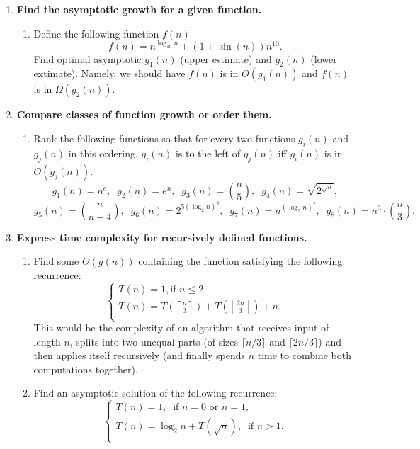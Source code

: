 \documentclass[a4paper,12pt]{article}
\begin{document}
\begin{enumerate}[label=3.\Alph*.]
\item {\bf Find the asymptotic growth for a given function.}
\begin{enumerate} 
\item Define the following function $f(n)$ 
\[ f(n) = n^{\log_{10} n} + (1 + \sin (n)) n^{10}. \]
Find optimal asymptotic $g_1(n)$ (upper estimate) and $g_2(n)$ (lower extimate).
Namely, we should have 
$f(n)$ is in $O(g_1(n))$ and $f(n)$ is in $\Omega(g_2(n))$.
\end{enumerate}
\item {\bf Compare classes of function growth or order them.}
\begin{enumerate} 
\item Rank the following functions so that for every two functions $g_i(n)$ 
and $g_j(n)$ in this ordering, $g_i(n)$ is to the left of $g_j(n)$ iff
$g_i(n)$ is in $O(g_j(n))$. 
\[ g_1(n) = n^e,\;\; g_2(n) = e^n,\;\; g_3(n) = {n \choose 5},\;\; g_4(n) = \sqrt{2^{\sqrt{n}}}, \]
\[ g_5(n) = {n \choose n-4},\;\; g_6(n) = 2^{5(\log_2 n)^3},\;\; g_7(n) = n^{(\log_2 n)^2},\;\;
g_8(n) = n^3 \cdot {n \choose 3}. 
\]
\end{enumerate}
\item {\bf Express time complexity for recursively defined functions.}
\begin{enumerate} 
\item 
Find some $\Theta(g(n))$ containing the function satisfying the 
following recurrence: 
\[ \left\{ \begin{array}{l}
T(n) = 1, \mbox{if $n \leq 2$} \\
T(n) = T\left( \left\lceil \frac{n}{3} \right\rceil \right) + T\left( \left\lceil \frac{2n}{3} \right\rceil \right) + n. \\
\end{array} \right. \]
This would be the complexity of an algorithm that receives input of length $n$, splits 
into two unequal parts (of sizes $\lceil n/3 \rceil$ and $\lceil 2n/3 \rceil$) and then applies itself recursively 
(and finally spends $n$ time to combine both computations together). 
\item 
Find an asymptotic solution of the following recurrence:
\[ \left\{ \begin{array}{l}
T(n) = 1,\;\;\mbox{if $n =0$ or $n=1$,} \\
T(n) = \log_2 n + T(\sqrt{n}),\;\;\mbox{if $n > 1$.}\\
\end{array} \right. \]



\end{enumerate}
\end{enumerate}
\end{document}
